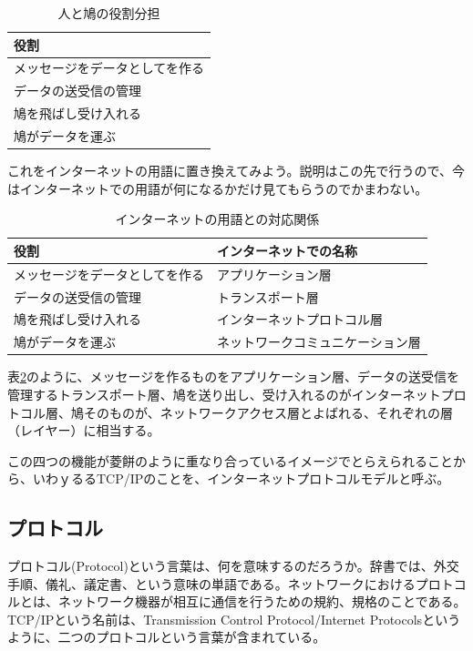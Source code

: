 \begin{table}[hbtp] 			
\begin{center} \label{hatostack}
	\begin{tabular}{l}  \toprule
		役割 \\ \midrule
		メッセージをデータとしてを作る \\
		データの送受信の管理 \\
		鳩を飛ばし受け入れる \\
		鳩がデータを運ぶ \\ \bottomrule
	\end{tabular}
\end{center} \caption{人と鳩の役割分担}
\end{table}

これをインターネットの用語に置き換えてみよう。説明はこの先で行うので、今はインターネットでの用語が何になるかだけ見てもらうのでかまわない。

\begin{table}[hbtp] 
\begin{center} \label{hatostack2}
	\begin{tabular}{ll} \toprule
		役割 & インターネットでの名称 \\ \midrule
		メッセージをデータとしてを作る & アプリケーション層 \\
		データの送受信の管理 & トランスポート層 \\
		鳩を飛ばし受け入れる & インターネットプロトコル層 \\
		鳩がデータを運ぶ & ネットワークコミュニケーション層 \\ \bottomrule
	\end{tabular}
\end{center} \caption{インターネットの用語との対応関係}
\end{table} 

表\ref{hatostack2}のように、メッセージを作るものをアプリケーション層、データの送受信を管理するトランスポート層、鳩を送り出し、受け入れるのがインターネットプロトコル層、鳩そのものが、ネットワークアクセス層とよばれる、それぞれの層（レイヤー）に相当する。

この四つの機能が菱餅のように重なり合っているイメージでとらえられることから、いわｙるるTCP/IPのことを、インターネットプロトコルモデルと呼ぶ。

\subsection{プロトコル}
プロトコル(Protocol)という言葉は、何を意味するのだろうか。辞書では、外交手順、儀礼、議定書、という意味の単語である。ネットワークにおけるプロトコルとは、ネットワーク機器が相互に通信を行うための規約、規格のことである。TCP/IPという名前は、Transmission Control Protocol/Internet Protocolsというように、二つのプロトコルという言葉が含まれている。


